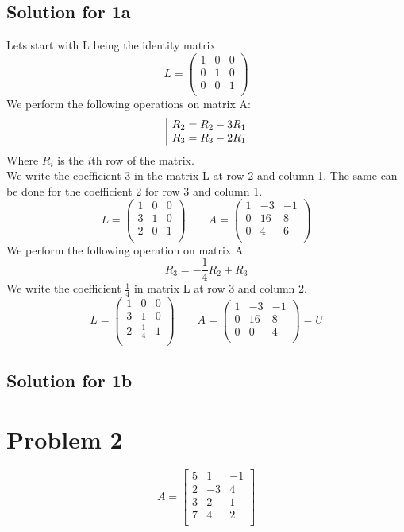 \documentclass[a4paper,fleqn,12pt]{article}
\begin{document}
\subsection{Solution for 1a}
Lets start with L being the identity matrix
$$
	L = \begin{pmatrix}
	1 & 0 & 0 \\
	0 & 1 & 0 \\
	0 & 0 & 1 \\
	\end{pmatrix}
$$
We perform the following operations on matrix A: 
$$
\begin{array}{|l@{}}
	R_2 = R_2 - 3R_1 \\
	R_3 = R_3 - 2R_1
\end{array}
$$
Where $R_i$ is the $i$th row of the matrix. \\
We write the coefficient 3 in the matrix L at row 2 and column 1. 
The same can be done for the coefficient 2 for row 3 and column 1.
$$
	L = \begin{pmatrix}
	1 & 0 & 0 \\
	3 & 1 & 0 \\
	2 & 0 & 1 \\
	\end{pmatrix} \qquad 
	A = \begin{pmatrix}
	1 & -3 & -1 \\
	0 & 16 & 8 \\
	0 & 4  & 6 \\
	\end{pmatrix}
$$
We perform the following operation on matrix A
$$
R_3 = -\frac{1}{4}R_2 + R_3
$$
We write the coefficient $\frac{1}{4}$ in matrix L at row 3 and column 2.
$$
L = \begin{pmatrix}
	1 & 0 & 0 \\
	3 & 1 & 0 \\
	2 & \frac{1}{4} & 1 \\
	\end{pmatrix} \qquad 
	A = \begin{pmatrix}
	1 & -3 & -1 \\
	0 & 16 & 8 \\
	0 & 0  & 4 \\
	\end{pmatrix} = U
$$
\newpage
\subsection{Solution for 1b}

\newpage

\section{Problem 2}
$$
A = \begin{bmatrix}
	5 & 1 & -1 \\
	2 & -3 & 4 \\
	3 & 2 & 1 \\
	7 & 4 & 2 \\
\end{bmatrix}
$$
\end{document}
